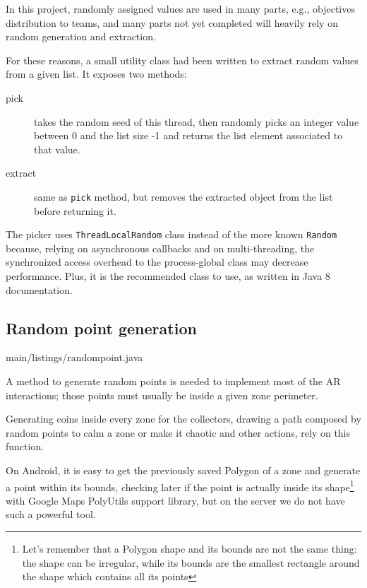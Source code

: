 			In this project, randomly assigned values are used in many parts, e.g., objectives distribution to teams, and many parts not yet completed will heavily rely on random generation and extraction.
			
			For these reasons, a small utility class had been written to extract random values from a given list. It exposes two methods:
			\begin{description}
				\item[pick] takes the random seed of this thread, then randomly picks an integer value between 0 and the list size -1 and returns the list element associated to that value. 
				\item[extract] same as \lstinline|pick| method, but removes the extracted object from the list before returning it.
			\end{description}
		
			The picker uses \lstinline|ThreadLocalRandom| class instead of the more known \lstinline|Random| because, relying on asynchronous callbacks and on multi-threading, the synchronized access overhead to the process-global class may decrease performance.
			Plus, it is the recommended class to use, as written in Java 8 documentation.
						
		\subsection{Random point generation}\label{focus:point}
		
			
							{main/listings/randompoint.java}
			
			A method to generate random points is needed to implement most of the AR interactions; those points must usually be inside a given zone perimeter.
			
			Generating coins inside every zone for the collectors, drawing a path composed by random points to calm a zone or make it chaotic and other actions, rely on this function.
			
			On Android, it is easy to get the previously saved Polygon of a zone and generate a point within its bounds, checking later if the point is actually inside its shape\footnote{Let's remember that a Polygon shape and its bounds are not the same thing: the shape can be irregular, while its bounds are the smallest rectangle around the shape which contains all its points} with Google Maps PolyUtils support library, but on the server we do not have such a powerful tool.
			
